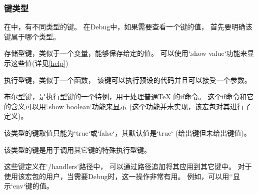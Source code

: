 \subsubsection{键类型}
\label{key-types}
在中，有不同类型的键。
在Debug中，如果需要查看一个键的值，
首先要明确该键属于哪个类型。

  存储型键，类似于一个变量，能够保存给定的值。
  可以使用`.show value`功能来显示这些值(详见\cref{help})

  执行型键，类似于一个函数，
  该键可以执行预设的代码并且可以接受一个参数。

  布尔型键，是执行型键的一个特例，用于处理普通\TeX{} 的if命令。
  这个if命令和它的含义可以用`.show boolean`功能来显示
  (这个功能并未实现，该宏包对其进行了定义)。

  该类型的键取值只能为`true`或`false`，其默认值是`true`
  (给出键但未给出键值)。

  该类型的键是用于调用其它键的特殊执行型键。

  这些键定义在`/handlers`路径中，
  可以通过路径追加将其应用到其它键中。
  对于使用该宏包的用户，当需要Debug时，这一操作非常有用。
  例如，可以用``显示`env`键的值。

